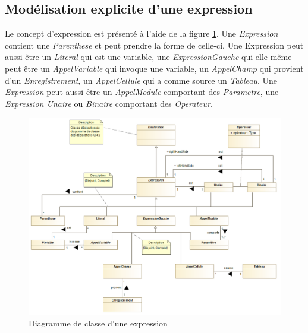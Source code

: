 
\subsection{Modélisation explicite d'une expression}
\label{sec:question12}

Le concept d'expression est présenté à l'aide de la figure \ref{fig:expression}. Une \emph{Expression} contient une \emph{Parenthese} et peut prendre la forme de celle-ci. Une Expression peut aussi être un \emph{Literal} qui est une variable, une 
\emph{ExpressionGauche} qui elle même peut être un \emph{AppelVariable} qui invoque une variable, un \emph{AppelChamp} qui provient d'un \emph{Enregistrement}, un \emph{AppelCellule} qui a comme source un \emph{Tableau}. Une \emph{Expression} peut aussi être
un \emph{AppelModule} comportant des \emph{Parametre}, une \emph{Expression Unaire} ou \emph{Binaire} comportant des \emph{Operateur}.

\begin{figure}
	\centering
	\includegraphics[width=500pt]{assets/class__Expression}
	\caption{Diagramme de classe d'une expression}
	\label{fig:expression}
\end{figure}